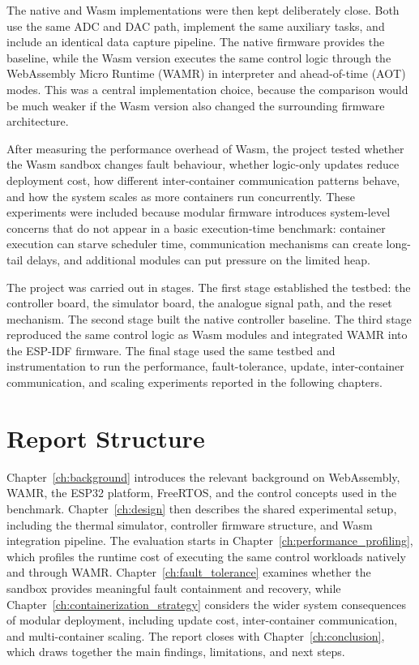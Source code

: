 \documentclass[12pt, a4paper]{report}
\begin{document}
The native and Wasm implementations were then kept deliberately close. Both use the same ADC and DAC path, implement the same auxiliary tasks, and include an identical data capture pipeline. The native firmware provides the baseline, while the Wasm version executes the same control logic through the WebAssembly Micro Runtime (WAMR) in interpreter and ahead-of-time (AOT) modes. This was a central implementation choice, because the comparison would be much weaker if the Wasm version also changed the surrounding firmware architecture.

After measuring the performance overhead of Wasm, the project tested whether the Wasm sandbox changes fault behaviour, whether logic-only updates reduce deployment cost, how different inter-container communication patterns behave, and how the system scales as more containers run concurrently. These experiments were included because modular firmware introduces system-level concerns that do not appear in a basic execution-time benchmark: container execution can starve scheduler time, communication mechanisms can create long-tail delays, and additional modules can put pressure on the limited heap.

The project was carried out in stages. The first stage established the testbed: the controller board, the simulator board, the analogue signal path, and the reset mechanism. The second stage built the native controller baseline. The third stage reproduced the same control logic as Wasm modules and integrated WAMR into the ESP-IDF firmware. The final stage used the same testbed and instrumentation to run the performance, fault-tolerance, update, inter-container communication, and scaling experiments reported in the following chapters.

\section{Report Structure}

Chapter~\ref{ch:background} introduces the relevant background on WebAssembly, WAMR, the ESP32 platform, FreeRTOS, and the control concepts used in the benchmark. Chapter~\ref{ch:design} then describes the shared experimental setup, including the thermal simulator, controller firmware structure, and Wasm integration pipeline. The evaluation starts in Chapter~\ref{ch:performance_profiling}, which profiles the runtime cost of executing the same control workloads natively and through WAMR. Chapter~\ref{ch:fault_tolerance} examines whether the sandbox provides meaningful fault containment and recovery, while Chapter~\ref{ch:containerization_strategy} considers the wider system consequences of modular deployment, including update cost, inter-container communication, and multi-container scaling. The report closes with Chapter~\ref{ch:conclusion}, which draws together the main findings, limitations, and next steps.
\end{document}
